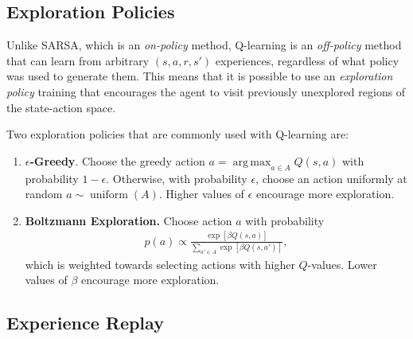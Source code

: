 \documentclass[11pt]{article}
\numberwithin{equation}{section}
\numberwithin{figure}{section}
\DeclareMathOperator*{\argmax}{arg\,max}
\DeclareMathOperator{\uniform}{uniform}
\begin{document}

\subsection{Exploration Policies}
Unlike SARSA, which is an \emph{on-policy} method,  Q-learning is an
\emph{off-policy} method that can learn from arbitrary $(s, a, r, s')$
experiences, regardless of what policy was used to generate them. This means
that it is possible to use an \emph{exploration policy} training that
encourages the agent to visit previously unexplored regions of the state-action
space.

Two exploration policies that are commonly used with Q-learning are:
\begin{enumerate}
    \item \textbf{$\epsilon$-Greedy}. Choose the greedy action $a = \argmax_{a
        \in A} Q(s, a)$ with probability $1 - \epsilon$. Otherwise, with probability
        $\epsilon$, choose an action uniformly at random $a \sim \uniform(A)$. Higher
        values of $\epsilon$ encourage more exploration.
    \item \textbf{Boltzmann Exploration.} Choose action $a$ with probability
        \begin{align*}
            p(a) \propto \frac{\exp\left[ \beta Q(s, a) \right]}
                              {\sum_{a' \in A} \exp\left[ \beta Q(s, a') \right]},
        \end{align*}
        which is weighted towards selecting actions with higher $Q$-values. Lower
        values of $\beta$ encourage more exploration.
\end{enumerate}

\subsection{Experience Replay}
\end{document}
